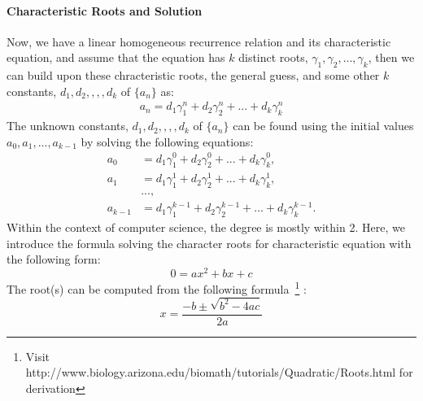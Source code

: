\documentclass[../main.tex]{subfiles}
\begin{document}
\paragraph{Characteristic Roots and Solution} Now, we have a linear homogeneous recurrence relation and its characteristic equation, 
and assume that the equation has $k$ distinct roots, $\gamma_1, \gamma_2, ..., \gamma_k$, then we can build upon these chracteristic roots, the general guess, and some other $k$ constants, $d_1, d_2, ,,, d_k$ of $\{a_n\}$ as:
\begin{align}
    a_n = d_1\gamma_1^n + d_2\gamma_2^n +...+d_k\gamma_k^n
\end{align}
The unknown constants, $d_1, d_2, ,,, d_k$ of $\{a_n\}$ can be found using the initial values $a_0, a_1, ..., a_{k-1}$ by solving the following equations:
\begin{align}
    a_0 &= d_1\gamma_1^0 + d_2\gamma_2^0 +...+d_k\gamma_k^0,\\
    a_1 &= d_1\gamma_1^1 + d_2\gamma_2^1 +...+d_k\gamma_k^1, \\
    &...,\\
    a_{k-1} &= d_1\gamma_1^{k-1} + d_2\gamma_2^{k-1} +...+d_k\gamma_k^{k-1}.
\end{align}
Within the context of computer science, the degree is mostly within 2. Here, we introduce the formula solving the character roots for  characteristic equation with the following form:
\begin{equation}
   0 = ax^2+bx+c
\end{equation}
The root(s) can be computed from the following formula~\footnote{Visit {http://www.biology.arizona.edu/biomath/tutorials/Quadratic/Roots.html} for derivation} :
\begin{equation}
    x = \frac{-b \pm \sqrt{b^2-4ac}}{2a}
\end{equation}
\end{document}
